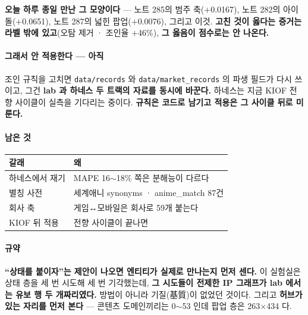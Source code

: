\documentclass[10pt]{article}
\begin{document}
\textbf{오늘 하루 종일 만난 그 모양이다} --- 노트 285의 범주 축($+$0.0167),
노트 282의 아이돌($+$0.0651), 노트 287의 넓힌 팝업($+$0.0076), 그리고 이것.
\textbf{고친 것이 옳다는 증거는 라벨 밖에 있고}(오탐 제거 · 조인율 $+$46\%),
\textbf{그 옳음이 점수로는 안 나온다.}

\paragraph{그래서 안 적용한다 --- 아직} 조인 규칙을 고치면
\texttt{data/records} 와 \texttt{data/market\_records} 의 파생 필드가 다시
쓰이고, 그건 \textbf{lab 과 하네스 두 트랙의 자료를 동시에 바꾼다.} 하네스는
지금 KIOF 전향 사이클이 실측을 기다리는 중이다. \textbf{규칙은 코드로
남기고 적용은 그 사이클 뒤로 미룬다.}

\paragraph{남은 것}
\begin{center}\small
\begin{tabular}{ll}
\hline
갈래 & 왜 \\
\hline
하네스에서 재기 & MAPE 16$\sim$18\% 쪽은 분해능이 다르다 \\
별칭 사전 & 세계애니 synonyms · anime\_match 87건 \\
회사 축 & 게임↔모바일은 회사로 59개 붙는다 \\
KIOF 뒤 적용 & 전향 사이클이 끝나면 \\
\hline
\end{tabular}
\end{center}

\paragraph{규약} \textbf{``상태를 붙이자''는 제안이 나오면 엔티티가 실제로
만나는지 먼저 센다.} 이 실험실은 상태 층을 세 번 시도해 세 번 기각했는데,
\textbf{그 시도들이 전제한 IP 그래프가 lab 에서는 유보 행 두 개짜리였다.}
방법이 아니라 기질(基質)이 없었던 것이다. 그리고 \textbf{허브가 있는 자리를
먼저 본다} --- 콘텐츠 도메인끼리는 0$\sim$53 인데 팝업 층은 263$\times$434 다.
\end{document}
